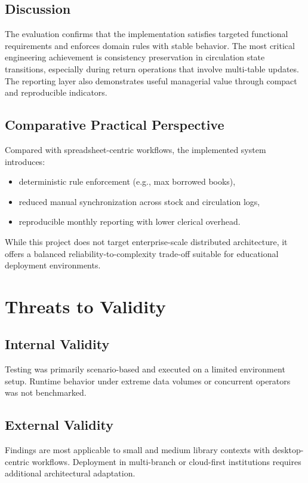 \documentclass[12pt,a4paper]{article}
\begin{document}
\subsection{Discussion}
The evaluation confirms that the implementation satisfies targeted functional requirements and enforces domain rules with stable behavior. The most critical engineering achievement is consistency preservation in circulation state transitions, especially during return operations that involve multi-table updates. The reporting layer also demonstrates useful managerial value through compact and reproducible indicators.

\subsection{Comparative Practical Perspective}
Compared with spreadsheet-centric workflows, the implemented system introduces:
\begin{itemize}[leftmargin=1.5cm]
    \item deterministic rule enforcement (e.g., max borrowed books),
    \item reduced manual synchronization across stock and circulation logs,
    \item reproducible monthly reporting with lower clerical overhead.
\end{itemize}
While this project does not target enterprise-scale distributed architecture, it offers a balanced reliability-to-complexity trade-off suitable for educational deployment environments.

\section{Threats to Validity}
\subsection{Internal Validity}
Testing was primarily scenario-based and executed on a limited environment setup. Runtime behavior under extreme data volumes or concurrent operators was not benchmarked.

\subsection{External Validity}
Findings are most applicable to small and medium library contexts with desktop-centric workflows. Deployment in multi-branch or cloud-first institutions requires additional architectural adaptation.
\end{document}
